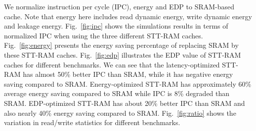 We normalize instruction per cycle (IPC), energy and EDP to SRAM-based cache. Note that energy here includes read dynamic energy, write dynamic energy and leakage energy. Fig.~\ref{fig:ipc} shows the simulations results in terms of normalized IPC when using the three different STT-RAM caches. Fig.~\ref{fig:energy} presents the energy saving percentage of replacing SRAM by these STT-RAM caches. Fig.~\ref{fig:edp} illustrates the EDP value of STT-RAM caches for different benchmarks. We can see that the latency-optimized STT-RAM has almost 50\% better IPC than SRAM, while it has negative energy saving compared to SRAM. Energy-optimized STT-RAM has approximately 60\% average energy saving compared to SRAM while IPC is 8\% degraded than SRAM. EDP-optimized STT-RAM has about 20\% better IPC than SRAM and also nearly 40\% energy saving compared to SRAM. Fig.~\ref{fig:ratio} shows the variation in read/write statistics for different benchmarks. 

